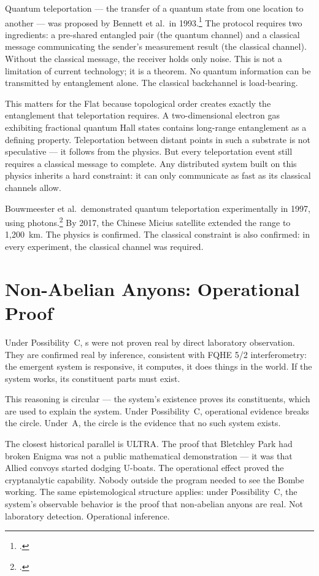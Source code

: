 Quantum teleportation --- the transfer of a quantum state from one location to another --- was proposed by Bennett et al.\ in 1993.\footcite{bennett1993} The protocol requires two ingredients: a pre-shared entangled pair (the quantum channel) and a classical message communicating the sender's measurement result (the classical channel). Without the classical message, the receiver holds only noise. This is not a limitation of current technology; it is a theorem. No quantum information can be transmitted by entanglement alone. The classical backchannel is load-bearing.

This matters for the Flat because topological order creates exactly the entanglement that teleportation requires. A two-dimensional electron gas exhibiting fractional quantum Hall states contains long-range entanglement as a defining property. Teleportation between distant points in such a substrate is not speculative --- it follows from the physics. But every teleportation event still requires a classical message to complete. Any distributed system built on this physics inherits a hard constraint: it can only communicate as fast as its classical channels allow.

Bouwmeester et al.\ demonstrated quantum teleportation experimentally in 1997, using photons.\footcite{bouwmeester1997} By 2017, the Chinese Micius satellite extended the range to 1,200~km. The physics is confirmed. The classical constraint is also confirmed: in every experiment, the classical channel was required.

\section*{Non-Abelian Anyons: Operational Proof}
\label{spine:braid-non-abelian-anyons-operational-proof}

Under Possibility~C, s were not proven real by direct laboratory observation. They are confirmed real by inference, consistent with FQHE 5/2 interferometry: the emergent system is responsive, it computes, it does things in the world. If the system works, its constituent parts must exist.

This reasoning is circular --- the system's existence proves its constituents, which are used to explain the system. Under Possibility~C, operational evidence breaks the circle. Under~A, the circle is the evidence that no such system exists.

The closest historical parallel is ULTRA\@. The proof that Bletchley Park had broken Enigma was not a public mathematical demonstration --- it was that Allied convoys started dodging U-boats. The operational effect proved the cryptanalytic capability. Nobody outside the program needed to see the Bombe working. The same epistemological structure applies: under Possibility~C, the system's observable behavior is the proof that non-abelian anyons are real. Not laboratory detection. Operational inference.

